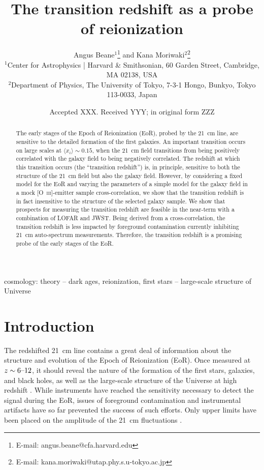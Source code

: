 \documentclass[a4paper,fleqn,usenatbib]{mnras}
\title[The Transition Redshift]{The transition redshift as a probe of reionization}
\author[A. Beane and K. Moriwaki]{
Angus Beane$^{1}$\thanks{E-mail: angus.beane@cfa.harvard.edu}
and Kana Moriwaki$^{2}$\thanks{E-mail: kana.moriwaki@utap.phy.s.u-tokyo.ac.jp}
\\
$^{1}$Center for Astrophysics {\normalfont |} Harvard \& Smithsonian, 60 Garden Street, Cambridge, MA 02138, USA\\
$^{2}$Department of Physics, The University of Tokyo, 7-3-1 Hongo, Bunkyo, Tokyo 113-0033, Japan
}
\date{Accepted XXX. Received YYY; in original form ZZZ}
\newcommand{\avg}[1]{\ensuremath{\langle #1 \rangle}}
\begin{document}
\label{firstpage}
\pagerange{\pageref{firstpage}--\pageref{lastpage}}
\maketitle

\begin{abstract}
The early stages of the Epoch of Reionization (EoR), probed by the 21~cm line,
are sensitive to the detailed formation of the first galaxies. An important
transition occurs on large scales at $\avg{x_i}\sim0.15$, when the 21~cm field
transitions from being positively correlated with the galaxy field to being
negatively correlated. The redshift at which this transition occurs (the
``transition redshift'') is, in principle, sensitive to both the structure of
the 21~cm field but also the galaxy field. However, by considering a fixed
model for the EoR and varying the parameters of a simple model for the galaxy
field in a mock [O~\textsc{iii}]-emitter sample cross-correlation, we show
that the transition redshift is in fact insensitive to the structure of the
selected galaxy sample. We show that prospects for measuring the transition
redshift are feasible in the near-term with a combination of LOFAR and JWST.
Being derived from a cross-correlation, the transition redshift is less
impacted by foreground contamination currently inhibiting 21~cm auto-spectrum
measurements. Therefore, the transition redshift is a promising probe of the
early stages of the EoR.
\end{abstract}

\begin{keywords}
cosmology: theory -- dark ages, reionization, first stars -- large-scale
structure of Universe
\end{keywords}



\section{Introduction}
The redshifted 21~cm line contains a great deal of information about the
structure and evolution of the Epoch of Reionization (EoR). Once measured at
$z\sim6\textup{--}12$, it should reveal the nature of the formation of the
first stars, galaxies, and black holes, as well as the large-scale structure
of the Universe at high redshift \citep{2013fgu..book.....L}. While
instruments have reached the sensitivity necessary to detect the signal during
the EoR, issues of foreground contamination and instrumental artifacts have so
far prevented the success of such efforts. Only upper limits have been placed
on the amplitude of the 21~cm fluctuations \citep[e.g.][]{2013MNRAS.433..639P,
2014PhRvD..89b3002D, 2016ApJ...833..102B, 2017ApJ...838...65P}.
\end{document}
